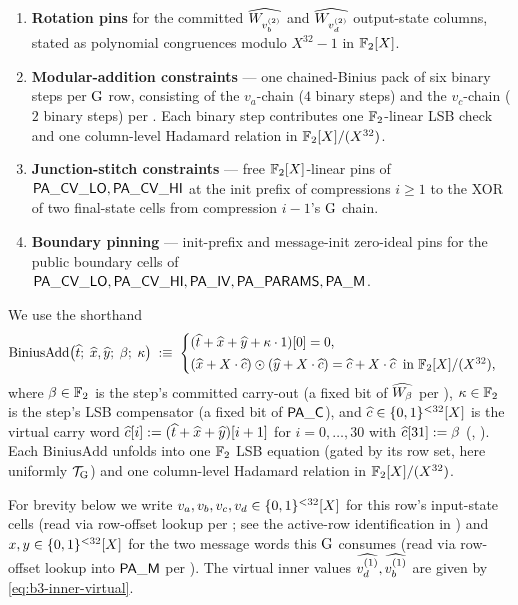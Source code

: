 \begin{enumerate}[label=(\Alph*)]
  \item \textbf{Rotation pins} for the committed
        $\widehat{W_{v_b^{(2)}}}$ and $\widehat{W_{v_d^{(2)}}}$ output-state
        columns, stated as polynomial congruences modulo $X^{32}-1$ in
        $\mathbb{F}_2[X]$.
  \item \textbf{Modular-addition constraints} — one chained-Binius
        pack of six binary steps per $\operatorname{G}$ row, consisting of the
        $v_a$-chain ($4$ binary steps) and the $v_c$-chain ($2$ binary
        steps) per . Each binary step
        contributes one $\mathbb{F}_2$-linear LSB check and one column-level
        Hadamard relation in $\mathbb{F}_2[X]/(X^{32})$.
  \item \textbf{Junction-stitch constraints} — free $\mathbb{F}_2[X]$-linear
        pins of $\mathsf{PA\_CV\_LO}, \mathsf{PA\_CV\_HI}$ at the init
        prefix of compressions $i \ge 1$ to the XOR of two
        final-state cells from compression $i-1$'s $\operatorname{G}$ chain.
  \item \textbf{Boundary pinning} — init-prefix and message-init
        zero-ideal pins for the public boundary cells of
        $\mathsf{PA\_CV\_LO}, \mathsf{PA\_CV\_HI}, \mathsf{PA\_IV},
        \mathsf{PA\_PARAMS}, \mathsf{PA\_M}$.
\end{enumerate}

We use the shorthand
\begin{equation}\label{eq:b3-binius-add-template}
\mathrm{BiniusAdd}\bigl(\widehat{t};\; \widehat{x}, \widehat{y};\; \beta;\; \kappa\bigr)
\;:\equiv\;
\begin{cases}
(\widehat{t} + \widehat{x} + \widehat{y} + \kappa \cdot 1)[0] = 0, \\[2pt]
(\widehat{x} + X\cdot\widehat{c}) \odot (\widehat{y} + X\cdot\widehat{c}) = \widehat{c} + X\cdot\widehat{c}
\;\;\text{in } \mathbb{F}_2[X]/(X^{32}),
\end{cases}
\end{equation}
where $\beta \in \mathbb{F}_2$ is the step's committed carry-out (a fixed bit
of $\widehat{W_\beta}$ per ), $\kappa \in \mathbb{F}_2$
is the step's LSB compensator (a fixed bit of $\mathsf{PA\_C}$), and
$\widehat{c} \in \{0,1\}^{<32}[X]$ is the virtual carry word
$\widehat{c}[i] := (\widehat{t} + \widehat{x} + \widehat{y})[i+1]$ for $i = 0, \dots, 30$
with $\widehat{c}[31] := \beta$ (,
). Each $\mathrm{BiniusAdd}$ unfolds into
one $\mathbb{F}_2$ LSB equation (gated by its row set, here uniformly
$\mathcal{T}_{\operatorname{G}}$) and one column-level Hadamard relation in
$\mathbb{F}_2[X]/(X^{32})$.

For brevity below we write $v_a, v_b, v_c, v_d \in \{0,1\}^{<32}[X]$ for
this row's input-state cells (read via row-offset lookup per
; see the active-row identification in
) and $x, y \in \{0,1\}^{<32}[X]$ for the
two message words this $\operatorname{G}$ consumes (read via row-offset lookup
into $\mathsf{PA\_M}$ per ). The virtual inner
values $\widehat{v_d^{(1)}}, \widehat{v_b^{(1)}}$ are given by
\eqref{eq:b3-inner-virtual}.

